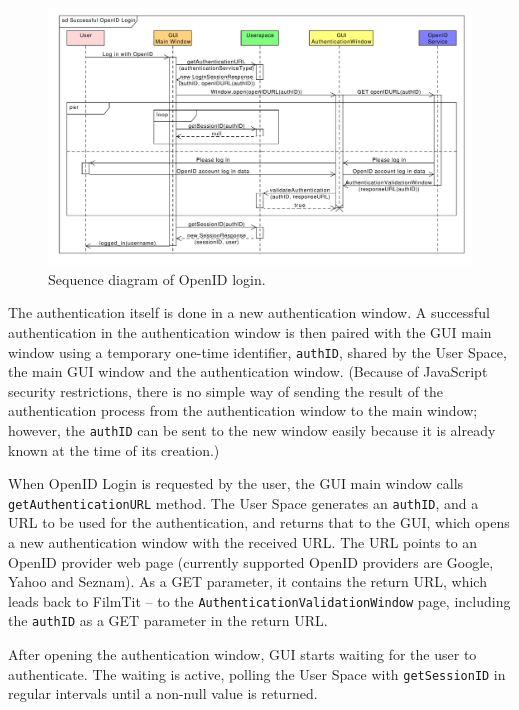 {\begin{figure}[h]
\begin{center}
\includegraphics[scale=0.55, angle=90]{figures/openid_login_sequence.pdf}
\end{center}
\caption{Sequence diagram of OpenID login.}\label{rpc:sd:openid_login}
\end{figure}

The authentication itself is done in a new authentication window.
A successful authentication in the authentication window is then paired with the GUI main window using a temporary one-time identifier, {\tt authID}, shared by the User Space, the main GUI window and the authentication window.
(Because of JavaScript security restrictions, there is no simple way of sending the result of the authentication process from the authentication window to the main window;
however, the {\tt authID} can be sent to the new window easily because it is already known at the time of its creation.)

When OpenID Login is requested by the user, the GUI main window calls {\tt getAuthenticationURL} method.
The User Space generates an {\tt authID}, and a URL to be used for the authentication, and returns that to the GUI, which opens a new authentication window with the received URL.
The URL points to an OpenID provider web page (currently supported OpenID providers are Google, Yahoo and Seznam). As a GET parameter, it contains the return URL, which leads back to FilmTit -- to the {\tt AuthenticationValidationWindow} page, including the {\tt authID} as a GET parameter in the return URL.

After opening the authentication window, GUI starts waiting for the user to authenticate. The waiting is active, polling the User Space with {\tt getSessionID} in regular intervals until a non-null value is returned.

}

